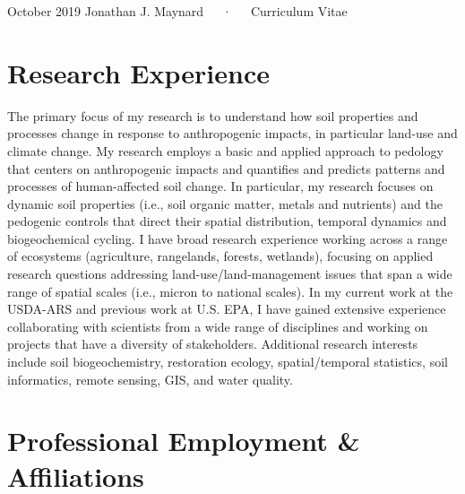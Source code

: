 \documentclass[11pt, letterpaper]{awesome-cv}
\begin{document}
\makecvheader

\makecvfooter
  {October 2019}
    {Jonathan J. Maynard~~~·~~~Curriculum Vitae}
  {\thepage}





\hypertarget{research-experience}{%
\section{Research Experience}\label{research-experience}}

The primary focus of my research is to understand how soil properties and processes change in response to anthropogenic impacts, in particular land-use and climate change. My research employs a basic and applied approach to pedology that centers on anthropogenic impacts and quantifies and predicts patterns and processes of human-affected soil change. In particular, my research focuses on dynamic soil properties (i.e., soil organic matter, metals and nutrients) and the pedogenic controls that direct their spatial distribution, temporal dynamics and biogeochemical cycling. I have broad research experience working across a range of ecosystems (agriculture, rangelands, forests, wetlands), focusing on applied research questions addressing land-use/land-management issues that span a wide range of spatial scales (i.e., micron to national scales). In my current work at the USDA-ARS and previous work at U.S. EPA, I have gained extensive experience collaborating with scientists from a wide range of disciplines and working on projects that have a diversity of stakeholders. Additional research interests include soil biogeochemistry, restoration ecology, spatial/temporal statistics, soil informatics, remote sensing, GIS, and water quality.

\hypertarget{professional-employment-affiliations}{%
\section{Professional Employment \& Affiliations}\label{professional-employment-affiliations}}
\end{document}
